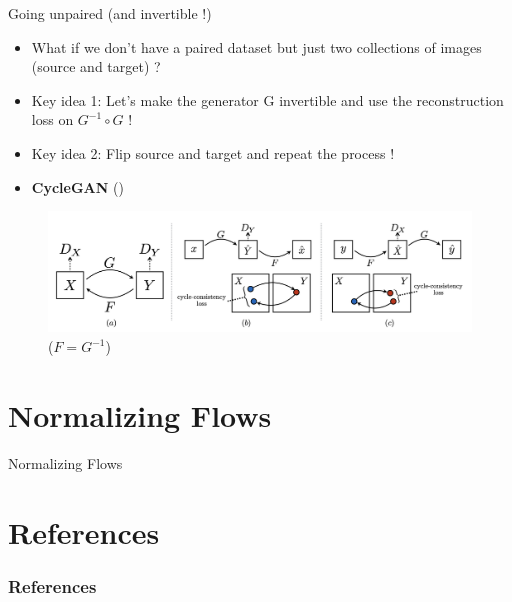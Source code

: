 \documentclass{beamer}
\begin{document}
 
 \begin{frame}{Going unpaired (and invertible !)}
 \begin{itemize}
        \item What if we don't have a paired dataset but just two collections of images (source and target) ?
        \item Key idea 1: Let's make the generator G invertible and use the reconstruction loss on $G^{-1} \circ G$ !
        \item Key idea 2: Flip source and target and repeat the process !
        \item \textcolor{cBlue}{\textbf{CycleGAN}} (\cite{cyclegan})
    \end{itemize}
    \begin{figure}
        \centering
        \includegraphics[width=0.8\linewidth]{images/cyclegans.png}
        \caption*{($F = G^{-1}$)}
    \end{figure}
\end{frame}

\section{Normalizing Flows}

\begin{frame}{Normalizing Flows}
    
\end{frame}

\section*{References}

\begin{frame}[allowframebreaks]\small
  \frametitle{References}
  \renewcommand*{\bibfont}{\footnotesize}
  \printbibliography
\end{frame}
\end{document}
